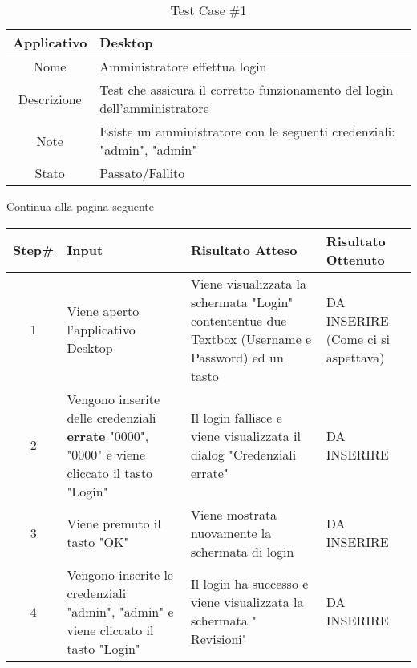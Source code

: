 
\setcounter{table}{0}
\begin{table}[H]
    \centering
    \footnotesize
    \caption{Test Case \#1}
    \begin{tabularx}{\textwidth}{|c|X|}
        \hline
        Applicativo & Desktop\\
        \hline
        Nome & Amministratore effettua login  \\
        \hline
        Descrizione & Test che assicura il corretto funzionamento del login dell'amministratore\\
        \hline
        Note & Esiste un amministratore con le seguenti credenziali: "admin", "admin" \\
        \hline
        Stato & Passato/Fallito\\
        \hline

    \end{tabularx}
    Continua alla pagina seguente
    \setlength{\tabcolsep}{8pt}
    \renewcommand{\arraystretch}{1.5}
\end{table}
\begin{table}[H]
    \footnotesize
    \begin{tabularx}{\textwidth}{|c|X|X|X|}
        \hline
        Step\# & Input & Risultato Atteso & Risultato Ottenuto \\
        \hline
         1 & Viene aperto l'applicativo Desktop  
         & Viene visualizzata la schermata "Login" contententue due Textbox (Username e Password) 
         ed un tasto
         &DA INSERIRE (Come ci si aspettava)\\
          \hline
        2 & Vengono inserite delle credenziali \textbf{errate} "0000", "0000" e viene cliccato 
        il tasto "Login" 
        & Il login fallisce e viene visualizzata il dialog "Credenziali errate"
        & DA INSERIRE\\
         \hline
         3 & Viene premuto il tasto "OK"
        & Viene mostrata nuovamente la schermata di login
        & DA INSERIRE\\
        4 & Vengono inserite le credenziali "admin", "admin" e viene cliccato 
        il tasto "Login" 
        & Il login ha successo e viene visualizzata la schermata "
        Revisioni" 
        & DA INSERIRE\\
         \hline
                 
    \end{tabularx}
\end{table}
    
       
